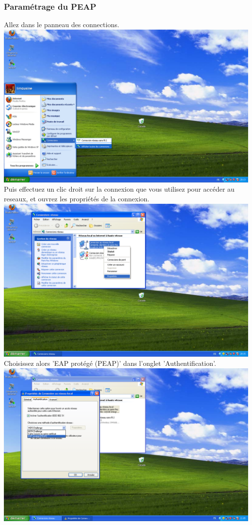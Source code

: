 \subsubsection{Paramétrage du PEAP}
Allez dans le panneau des connections.\\
\includegraphics[width=\screenShotSize{}]{imgUser/connections.PNG}\\
Puis effectuez un clic droit sur la connexion que vous utilisez pour accéder au reseaux, et ouvrez les propriétés de la connexion.\\
\includegraphics[width=\screenShotSize{}]{imgUser/connectionProperties.PNG}\\
Choisissez alors 'EAP protégé (PEAP)' dans l'onglet 'Authentification'.\\
\includegraphics[width=\screenShotSize{}]{imgUser/peap.PNG}\\
